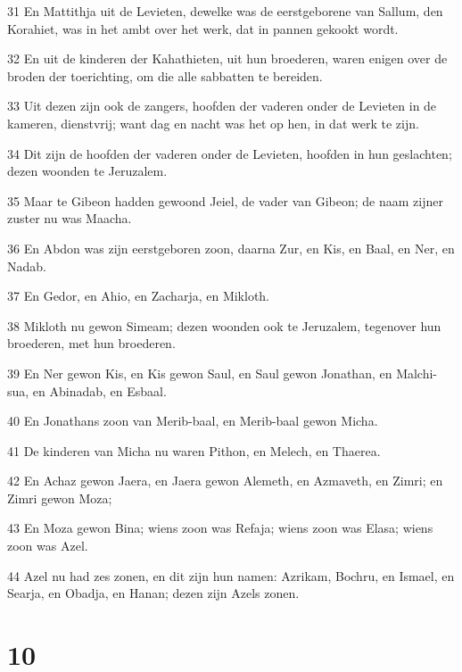 \par 31 En Mattithja uit de Levieten, dewelke was de eerstgeborene van Sallum, den Korahiet, was in het ambt over het werk, dat in pannen gekookt wordt.
\par 32 En uit de kinderen der Kahathieten, uit hun broederen, waren enigen over de broden der toerichting, om die alle sabbatten te bereiden.
\par 33 Uit dezen zijn ook de zangers, hoofden der vaderen onder de Levieten in de kameren, dienstvrij; want dag en nacht was het op hen, in dat werk te zijn.
\par 34 Dit zijn de hoofden der vaderen onder de Levieten, hoofden in hun geslachten; dezen woonden te Jeruzalem.
\par 35 Maar te Gibeon hadden gewoond Jeiel, de vader van Gibeon; de naam zijner zuster nu was Maacha.
\par 36 En Abdon was zijn eerstgeboren zoon, daarna Zur, en Kis, en Baal, en Ner, en Nadab.
\par 37 En Gedor, en Ahio, en Zacharja, en Mikloth.
\par 38 Mikloth nu gewon Simeam; dezen woonden ook te Jeruzalem, tegenover hun broederen, met hun broederen.
\par 39 En Ner gewon Kis, en Kis gewon Saul, en Saul gewon Jonathan, en Malchi-sua, en Abinadab, en Esbaal.
\par 40 En Jonathans zoon van Merib-baal, en Merib-baal gewon Micha.
\par 41 De kinderen van Micha nu waren Pithon, en Melech, en Thaerea.
\par 42 En Achaz gewon Jaera, en Jaera gewon Alemeth, en Azmaveth, en Zimri; en Zimri gewon Moza;
\par 43 En Moza gewon Bina; wiens zoon was Refaja; wiens zoon was Elasa; wiens zoon was Azel.
\par 44 Azel nu had zes zonen, en dit zijn hun namen: Azrikam, Bochru, en Ismael, en Searja, en Obadja, en Hanan; dezen zijn Azels zonen.

\chapter{10}

